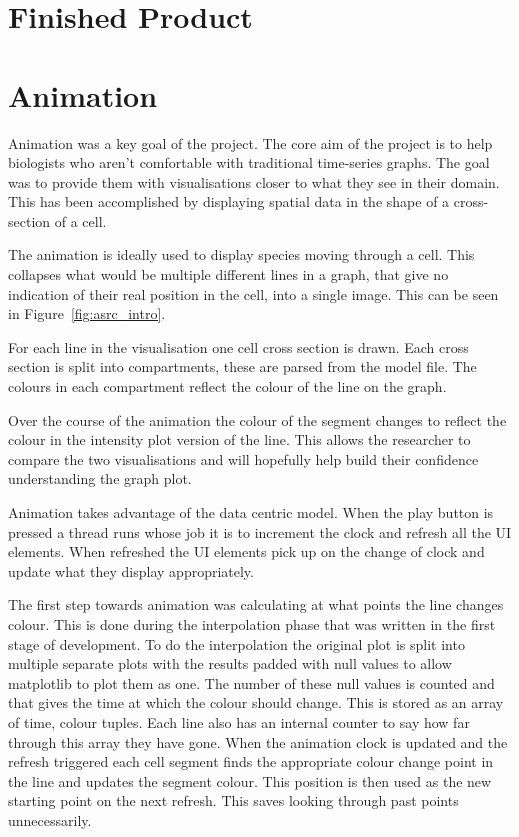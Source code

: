 \section{Finished Product}

\section{Animation}
\label{sec:animation}

Animation was a key goal of the project.  The core aim of the project is to help biologists who aren't comfortable with traditional time-series graphs.  The goal was to provide them with visualisations closer to what they see in their domain.  This has been accomplished by displaying spatial data in the shape of a cross-section of a cell.

The animation is ideally used to display species moving through a cell.  This collapses what would be multiple different lines in a graph, that give no indication of their real position in the cell, into a single image.  This can be seen in Figure~\ref{fig:asrc_intro}.

For each line in the visualisation one cell cross section is drawn.  Each cross section is split into compartments, these are parsed from the model file.  The colours in each compartment reflect the colour of the line on the graph.

Over the course of the animation the colour of the segment changes to reflect the colour in the intensity plot version of the line.  This allows the researcher to compare the two visualisations and will hopefully help build their confidence understanding the graph plot.

Animation takes advantage of the data centric model.  When the play button is pressed a thread runs whose job it is to increment the clock and refresh all the \ac{UI} elements.  When refreshed the \ac{UI} elements pick up on the change of clock and update what they display appropriately.

The first step towards animation was calculating at what points the line changes colour.  This is done during the interpolation phase that was written in the first stage of development.  To do the interpolation the original plot is split into multiple separate plots with the results padded with null values to allow matplotlib to plot them as one.  The number of these null values is counted and that gives the time at which the colour should change.  This is stored as an array of time, colour tuples.  Each line also has an internal counter to say how far through this array they have gone.  When the animation clock is updated and the refresh triggered each cell segment finds the appropriate colour change point in the line and updates the segment colour.  This position is then used as the new starting point on the next refresh.  This saves looking through past points unnecessarily.


